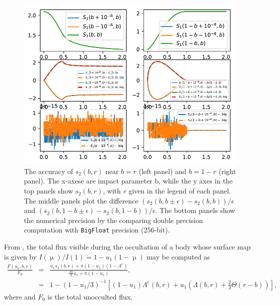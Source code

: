 \documentclass[modern]{aastex61}
\begin{document}
\begin{figure}\label{s2_machine}
    \begin{centering}
    \includegraphics[width=\linewidth]{figures/julia/s2_machine.pdf}
    \caption{The accuracy of $s_2(b,r)$ near $b=r$ (left panel) and
    $b=1-r$ (right panel). The x-axese are impact parameter b,
    while the y axes in the top panels show $s_2(b,r)$, with $r$
    given in the legend of each panel. The middle panels plot
    the difference $(s_2(b,b\pm\epsilon)-s_2(b,b))/\epsilon$
    and $(s_2(b,1-b\pm\epsilon)-s_2(b,1-b))/\epsilon$. The bottom
    panels show the numerical precision by the comparing double precision
    computation with \texttt{BigFloat} precision (256-bit).}
    \end{centering}
\end{figure}


From \citet{MandelAgol2002}, the total flux visible during the occultation of a
body whose surface map is given by $I(\upmu)/I(1) = 1 - u_1(1 - \upmu)$ may be computed
as
\begin{eqnarray}
\frac{F(u_1,b,r)}{F_0} &=& \frac{u_1 s_2(b,r) + \pi(1-u_1)(1-\Lambda^e)}{\frac{2\pi}{3}u_1 + \pi(1-u_1)},\\
&=& 1-(1-u_1/3)^{-1}\left[(1-u_1)\Lambda^e(b,r) + u_1\left(\Lambda(b,r)+\tfrac{2}{3}\Theta(r-b)\right)\right],
\end{eqnarray}
where
and $F_0$ is the total unocculted flux.  %

%
\clearpage
\end{document}
